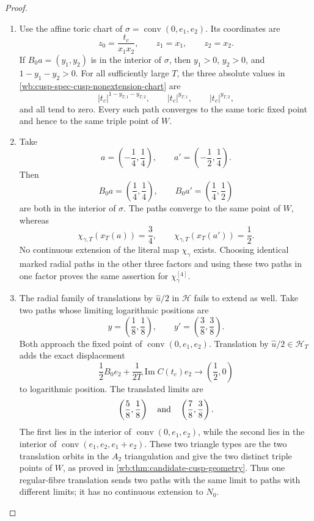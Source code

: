 \begin{proof}
\begin{enumerate}[label=\arabic*.,leftmargin=*]
\item Use the affine toric chart of
\(\sigma=\operatorname{conv}(0,e_1,e_2)\).  Its coordinates are
\begin{equation}
 z_0=\frac{t_c}{x_1x_2},\qquad z_1=x_1,\qquad z_2=x_2.
 \label{wb:cusp-spec-cusp-nonextension-chart}
\end{equation}
If \(B_0a=(y_1,y_2)\) is in the interior of \(\sigma\), then
\(y_1>0\), \(y_2>0\), and \(1-y_1-y_2>0\).  For all sufficiently large
\(T\), the three absolute values in
\cref{wb:cusp-spec-cusp-nonextension-chart} are
\[
 |t_c|^{1-y_{T,1}-y_{T,2}},\qquad
 |t_c|^{y_{T,1}},\qquad |t_c|^{y_{T,2}},
\]
and all tend to zero.  Every such path converges to the same toric fixed
point and hence to the same triple point of \(W\).

\item Take
\[
 a=\left(-\frac14,\frac14\right),\qquad
 a'=\left(-\frac12,\frac14\right).
\]
Then
\[
 B_0a=\left(\frac14,\frac14\right),\qquad
 B_0a'=\left(\frac14,\frac12\right)
\]
are both in the interior of \(\sigma\).  The paths converge to the same
point of \(W\), whereas
\[
 \chi_{\gamma,T}(x_T(a))=\frac34,\qquad
 \chi_{\gamma,T}(x_T(a'))=\frac12.
\]
No continuous extension of the literal map \(\chi_\gamma\) exists.
Choosing identical marked radial paths in the other three factors and
using these two paths in one factor proves the same assertion for
\(\chi_\gamma^{[4]}\).

\item The radial family of translations by \(\widehat u/2\) in \(\mathcal H\)
fails to extend as well.  Take two paths
whose limiting logarithmic positions are
\[
 y=\left(\frac18,\frac18\right),\qquad
 y'=\left(\frac38,\frac38\right).
\]
Both approach the fixed point of
\(\operatorname{conv}(0,e_1,e_2)\).  Translation by
\(\widehat u/2\in\mathcal H_T\) adds the exact displacement
\[
 \frac12B_0e_2+
 \frac1{2T}\operatorname{Im}C(t_c)e_2
 \longrightarrow\left(\frac12,0\right)
\]
to logarithmic position.  The translated limits are
\[
 \left(\frac58,\frac18\right)
 \quad\hbox{and}\quad
 \left(\frac78,\frac38\right).
\]
The first lies in the interior of
\(\operatorname{conv}(0,e_1,e_2)\), while the second lies in the interior
of \(\operatorname{conv}(e_1,e_2,e_1+e_2)\).  These two triangle types are
the two translation orbits in the \(A_2\) triangulation and give the two
distinct triple points of \(W\), as proved in
\cref{wb:thm:candidate-cusp-geometry}.  Thus one regular-fibre translation
sends two paths with the same limit to paths with different limits; it has
no continuous extension to \(N_0\).


\end{enumerate}
\end{proof}
